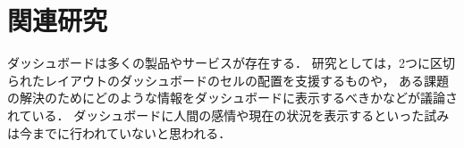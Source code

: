 \section{関連研究}

ダッシュボードは多くの製品やサービスが存在する．
研究としては，2つに区切られたレイアウトのダッシュボードのセルの配置を支援するもの\cite{Hertzog:2015:BSP:2678025.2701383}や，
ある課題の解決のためにどのような情報をダッシュボードに表示するべきか\cite{Jones:2015:ECI:2800835.2800963}などが議論されている．
ダッシュボードに人間の感情や現在の状況を表示するといった試みは今までに行われていないと思われる．